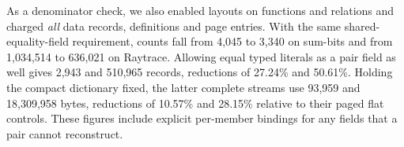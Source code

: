 As a denominator check, we also enabled layouts on functions and relations and charged \emph{all} data records, definitions and page entries. With the same shared-equality-field requirement, counts fall from 4,045 to 3,340 on sum-bits and from 1,034,514 to 636,021 on Raytrace. Allowing equal typed literals as a pair field as well gives 2,943 and 510,965 records, reductions of 27.24\% and 50.61\%. Holding the compact dictionary fixed, the latter complete streams use 93,959 and 18,309,958 bytes, reductions of 10.57\% and 28.15\% relative to their paged flat controls. These figures include explicit per-member bindings for any fields that a pair cannot reconstruct.
